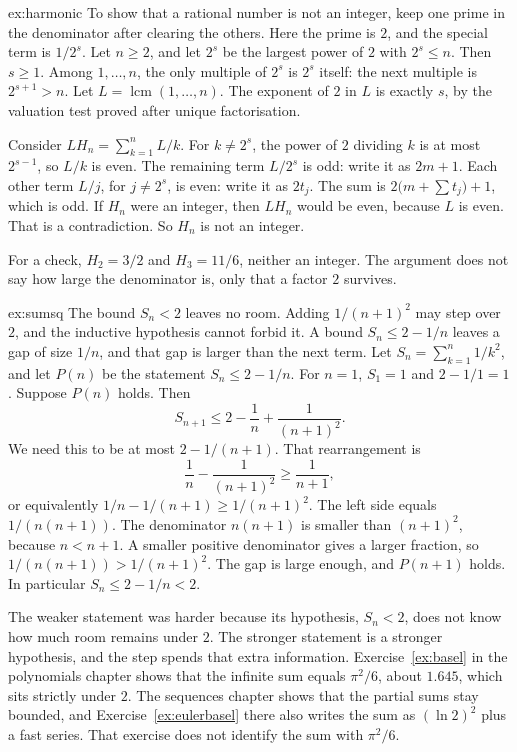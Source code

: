 \begin{solution}{ex:harmonic}
\idea To show that a rational number is not an integer, keep one prime in the denominator after clearing the others. Here the prime is $2$, and the special term is $1/2^s$.
\writeup Let $n\ge2$, and let $2^s$ be the largest power of $2$ with $2^s\le n$. Then $s\ge1$. Among $1,\dots,n$, the only multiple of $2^s$ is $2^s$ itself: the next multiple is $2^{s+1}>n$. Let $L=\operatorname{lcm}(1,\dots,n)$. The exponent of $2$ in $L$ is exactly $s$, by the valuation test proved after unique factorisation.

Consider $L H_n=\sum_{k=1}^n L/k$. For $k\ne2^s$, the power of $2$ dividing $k$ is at most $2^{s-1}$, so $L/k$ is even. The remaining term $L/2^s$ is odd: write it as $2m+1$. Each other term $L/j$, for $j\ne 2^s$, is even: write it as $2t_j$. The sum is $2\bigl(m+\sum t_j\bigr)+1$, which is odd. If $H_n$ were an integer, then $L H_n$ would be even, because $L$ is even. That is a contradiction. So $H_n$ is not an integer.

For a check, $H_2=3/2$ and $H_3=11/6$, neither an integer. The argument does not say how large the denominator is, only that a factor $2$ survives.
\end{solution}

\begin{solution}{ex:sumsq}
\idea The bound $S_n<2$ leaves no room. Adding $1/(n+1)^2$ may step over $2$, and the inductive hypothesis cannot forbid it. A bound $S_n\le2-1/n$ leaves a gap of size $1/n$, and that gap is larger than the next term.
\writeup Let $S_n=\sum_{k=1}^n 1/k^2$, and let $P(n)$ be the statement $S_n\le2-1/n$. For $n=1$, $S_1=1$ and $2-1/1=1$. Suppose $P(n)$ holds. Then
\[
S_{n+1}\le2-\frac1n+\frac1{(n+1)^2}.
\]
We need this to be at most $2-1/(n+1)$. That rearrangement is
\[
\frac1n-\frac1{(n+1)^2}\ge\frac1{n+1},
\]
or equivalently $1/n-1/(n+1)\ge1/(n+1)^2$. The left side equals $1/(n(n+1))$. The denominator $n(n+1)$ is smaller than $(n+1)^2$, because $n<n+1$. A smaller positive denominator gives a larger fraction, so $1/(n(n+1))>1/(n+1)^2$. The gap is large enough, and $P(n+1)$ holds. In particular $S_n\le2-1/n<2$.

The weaker statement was harder because its hypothesis, $S_n<2$, does not know how much room remains under $2$. The stronger statement is a stronger hypothesis, and the step spends that extra information. Exercise~\ref{ex:basel} in the polynomials chapter shows that the infinite sum equals $\pi^2/6$, about $1.645$, which sits strictly under $2$. The sequences chapter shows that the partial sums stay bounded, and Exercise~\ref{ex:eulerbasel} there also writes the sum as $(\ln 2)^2$ plus a fast series. That exercise does not identify the sum with $\pi^2/6$.
\end{solution}

